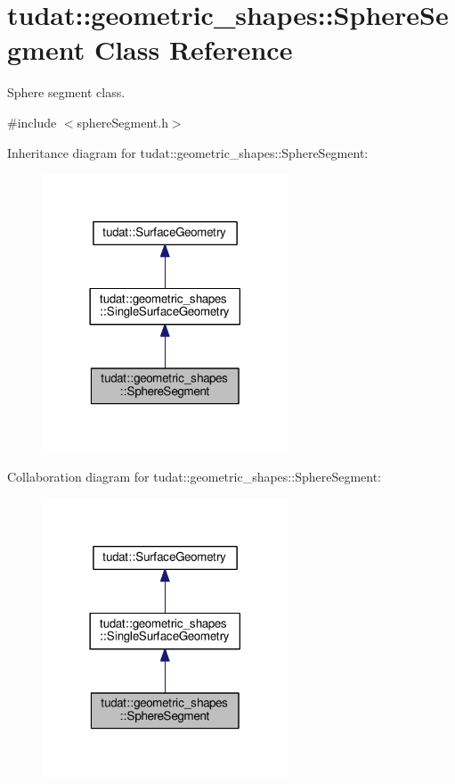 \hypertarget{classtudat_1_1geometric__shapes_1_1SphereSegment}{}\section{tudat\+:\+:geometric\+\_\+shapes\+:\+:Sphere\+Segment Class Reference}
\label{classtudat_1_1geometric__shapes_1_1SphereSegment}


Sphere segment class.  




{\ttfamily \#include $<$sphere\+Segment.\+h$>$}



Inheritance diagram for tudat\+:\+:geometric\+\_\+shapes\+:\+:Sphere\+Segment\+:
\nopagebreak
\begin{figure}[H]
\begin{center}
\leavevmode
\includegraphics[width=206pt]{classtudat_1_1geometric__shapes_1_1SphereSegment__inherit__graph}
\end{center}
\end{figure}


Collaboration diagram for tudat\+:\+:geometric\+\_\+shapes\+:\+:Sphere\+Segment\+:
\nopagebreak
\begin{figure}[H]
\begin{center}
\leavevmode
\includegraphics[width=206pt]{classtudat_1_1geometric__shapes_1_1SphereSegment__coll__graph}
\end{center}
\end{figure}
